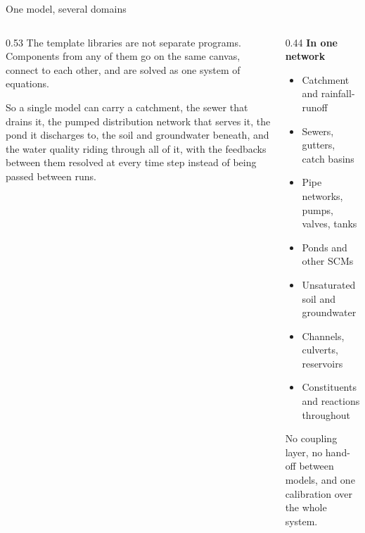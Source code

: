 \documentclass[aspectratio=169, 10pt]{beamer}
\begin{document}
\begin{frame}{One model, several domains}
  \begin{columns}[T,onlytextwidth]
    \begin{column}{0.53\textwidth}
      The template libraries are not separate programs. Components from any of
      them go on the \alert{same canvas}, connect to each other, and are solved
      \alert{as one system of equations}.
      \vspace{0.5em}

      So a single model can carry a catchment, the sewer that drains it, the
      pumped distribution network that serves it, the pond it discharges to,
      the soil and groundwater beneath, and the water quality riding through
      all of it, with the feedbacks between them resolved at every time step
      instead of being passed between runs.
    \end{column}
    \begin{column}{0.44\textwidth}
      \textbf{\small In one network}
      \begin{itemize}\setlength\itemsep{1pt}
        \item Catchment and rainfall-runoff
        \item Sewers, gutters, catch basins
        \item Pipe networks, pumps, valves, tanks
        \item Ponds and other SCMs
        \item Unsaturated soil and groundwater
        \item Channels, culverts, reservoirs
        \item Constituents and reactions throughout
      \end{itemize}
      \vspace{0.4em}
      {\scriptsize No coupling layer, no hand-off between models, and one
      calibration over the whole system.}
    \end{column}
  \end{columns}
\end{frame}
\end{document}
